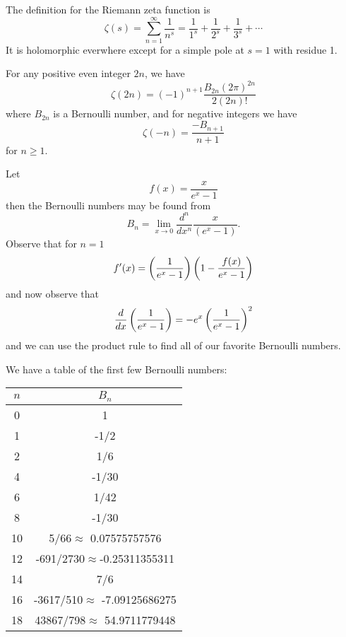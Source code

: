 The definition for the Riemann zeta function is
\begin{equation}%
\zeta(s)=\sum_{n=1}^{\infty}\frac{1}{n^s}=\frac{1}{1^s} + \frac{1}{2^s} + \frac{1}{3^s} + \cdots
\end{equation}
It is holomorphic everwhere except for a simple pole at $s=1$
with residue 1.

For any positive even integer $2n$, we have
\begin{equation}%
\zeta(2n) = (-1)^{n+1}\frac{B_{2n}(2\pi)^{2n}}{2(2n)!}
\end{equation}
where $B_{2n}$ is a Bernoulli number, and for negative integers
we have
\begin{equation}%
\zeta(-n)=\frac{-B_{n+1}}{n+1}
\end{equation}
for $n\geq1$.

Let
\begin{equation}%
f(x) = \frac{x}{e^x-1}
\end{equation}
then the Bernoulli numbers may be found from
\begin{equation}%
 B_n=\lim_{x\to0}\frac{d^n}{dx^n}\frac{x}{(e^x-1)}. 
\end{equation}
Observe that for $n=1$
\begin{equation}%
f'(x) = \left({{1}\over{e^{x}-1}}\right)\left(1-\frac{f(x)}{e^x-1}\right)
\end{equation}
and now observe that
\begin{equation}%
\frac{d}{dx}\left(\frac{1}{e^x-1}\right) = -e^x\left({{1}\over{e^{x}-1}}\right)^2
\end{equation}
and we can use the product rule to find all of our favorite
Bernoulli numbers.

We have a table of the first few Bernoulli numbers:
\begin{center}
\begin{tabular}{|c|c|}
\hline
$n$ & $B_n$\\\hline
0 & 1\\\hline
1 & -1/2\\\hline
2 & 1/6\\\hline
4 & -1/30\\\hline
6 & 1/42\\\hline
8 & -1/30\\\hline
10& 5/66$\approx$ 0.07575757576\\\hline
12& -691/2730$\approx$-0.25311355311\\\hline
14& 7/6\\\hline
16& -3617/510$\approx$ -7.09125686275\\\hline
18& 43867/798$\approx$ 54.9711779448\\\hline
\end{tabular}
\end{center}

